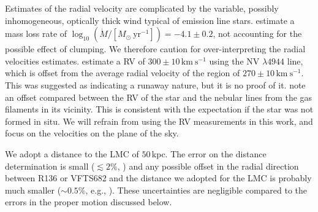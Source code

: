 \documentclass[a4paper,fleqn,usenatbib]{mnras}
\newcommand{\kms}{{\,\mathrm{km\ s^{-1}}}}
\begin{document}
Estimates of the radial velocity are complicated by the variable,
possibly inhomogeneous, optically thick wind  typical of emission line
stars. \citet{bestenlehner:11} estimate a mass loss rate of
$\log_{10}(\dot{M}/[M_\odot \ \mathrm{yr}^{-1}])=-4.1\pm0.2$, not accounting for the
possible effect of clumping.  We therefore caution
for over-interpreting the radial velocities estimates. %
\citet{bestenlehner:11}  estimate a RV of
$300\pm10\kms$ using the  N{\footnotesize V} $\lambda4944$ line, which
is offset from the average radial velocity of the region of
$270\pm10\kms$. This was suggested as indicating a runaway nature, but
it is no proof of it. %
\cite{bressert:12} note an offset compared between the RV of
the star and the nebular lines from the gas filaments in its
vicinity. This is consistent with the expectation if the star was not
formed in situ. We will refrain from using the RV measurements in this
work, and focus on the velocities on the plane of the sky. 

We adopt a distance to the LMC of $50$\,kpc. The error on
the distance determination is small ($\lesssim2\%$,
\citealt{pietrzynski:13}) and any possible offset in the radial
direction between R136 or VFTS682 and the distance we adopted for the
LMC is probably much smaller ($\sim$$0.5\%$, e.g., \citealt{luks:92}). These uncertainties are negligible compared to the errors in the proper motion discussed below.  

\end{document}
